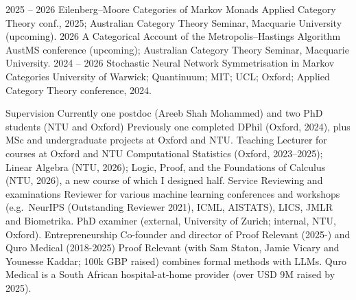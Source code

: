 \documentclass[9pt]{developercv}
\begin{document}
\begin{entrylist}
    \entry
    {2025 -- 2026}
    {Eilenberg--Moore Categories of Markov Monads}
    {}
    {Applied Category Theory conf., 2025; Australian Category Theory Seminar, Macquarie University (upcoming).}
    \entry
    {2026}
    {A Categorical Account of the Metropolis--Hastings Algorithm}
    {}
    {AustMS conference (upcoming); Australian Category Theory Seminar, Macquarie University.}
    \entry
    {2024 -- 2026}
    {Stochastic Neural Network Symmetrisation in Markov Categories}
    {}
    {University of Warwick; Quantinuum; MIT; UCL; Oxford; Applied Category Theory conference, 2024.}
\end{entrylist}

\vspace{-2em}

\begin{entrylist}
    \entry
    {Supervision}
    {Currently one postdoc (Areeb Shah Mohammed) and two PhD students (NTU and Oxford)}
    {}
    {Previously one completed DPhil (Oxford, 2024), plus MSc and undergraduate projects at Oxford and NTU.}
    \entry
    {Teaching}
    {Lecturer for courses at Oxford and NTU}
    {}
    {Computational Statistics (Oxford, 2023--2025); Linear Algebra (NTU, 2026); Logic, Proof, and the Foundations of Calculus (NTU, 2026), a new course of which I designed half.}
    \entry
    {Service}
    {Reviewing and examinations}
    {}
    {Reviewer for various machine learning conferences and workshops (e.g.\ NeurIPS (Outstanding Reviewer 2021), ICML, AISTATS), LICS, JMLR and Biometrika. PhD examiner (external, University of Zurich; internal, NTU, Oxford).}
    \entry
    {Entrepreneurship}
    {Co-founder and director of Proof Relevant (2025-) and Quro Medical (2018-2025)}
    {}
    {Proof Relevant (with Sam Staton, Jamie Vicary and Younesse Kaddar; 100k GBP raised) combines formal methods with LLMs. Quro Medical is a South African hospital-at-home provider (over USD 9M raised by 2025).}
\end{entrylist}
\end{document}
